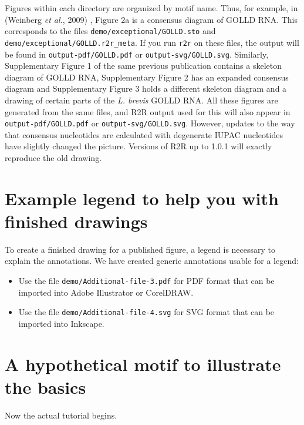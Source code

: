 \documentclass[letterpaper,12pt]{report}
\begin{document}
Figures within each directory are organized by motif name.
Thus, for example, in (Weinberg {\it et al.}, 2009) \cite{CoolRNAs}, Figure 2a is a consensus diagram of GOLLD RNA.
This corresponds to the files {\tt demo/exceptional/GOLLD.sto} and {\tt demo/exceptional/GOLLD.r2r\_meta}.
If you run {\tt r2r} on these files, the output will be found in {\tt output-pdf/GOLLD.pdf} or {\tt output-svg/GOLLD.svg}.
Similarly, Supplementary Figure 1 of the same previous publication contains a skeleton diagram of GOLLD RNA,
Supplementary Figure 2 has an expanded consensus diagram and Supplementary Figure 3 holds a different skeleton diagram and
a drawing of certain parts of the {\it L. brevis} GOLLD RNA.
All these figures are generated from the same files, and R2R output used for this will also appear in
{\tt output-pdf/GOLLD.pdf} or {\tt output-svg/GOLLD.svg}.
However, updates to the way that consensus nucleotides are calculated with degenerate IUPAC nucleotides have slightly changed the picture.  Versions of R2R up to 1.0.1 will exactly reproduce the old drawing.

\section{Example legend to help you with finished drawings}

To create a finished drawing for a published figure, a legend is necessary to explain the annotations.
We have created generic annotations usable for a legend:
\begin{itemize}
\item Use the file {\tt demo/Additional-file-3.pdf} for PDF format that can be imported into
Adobe Illustrator or CorelDRAW.
\item Use the file {\tt demo/Additional-file-4.svg} for SVG format that can be imported into Inkscape.
\end{itemize}

\section{A hypothetical motif to illustrate the basics}

Now the actual tutorial begins.
\end{document}
